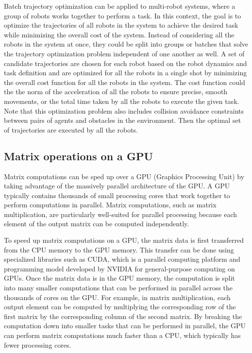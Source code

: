 Batch trajectory optimization can be applied to multi-robot systems, where a group of robots works together to perform a task. In this context, the goal is to optimize the trajectories of all robots in the system to achieve the desired task while minimizing the overall cost of the system. Instead of considering all the robots in the system at once, they could be split into groups or batches that solve the trajectory optimization problem independent of one another as well. A set of candidate trajectories are chosen for each robot based on the robot dynamics and task definition and are optimized for all the robots in a single shot by minimizing the overall cost function for all the robots in the system. The cost function could the the norm of the acceleration of all the robots to ensure precise, smooth movements, or the total time taken by all the robots to execute the given task. Note that this optimization problem also includes collision avoidance constraints between pairs of agents and obstacles in the environment. Then the optimal set of trajectories are executed by all the robots. 

\subsection{Matrix operations on a GPU}

Matrix computations can be sped up over a GPU (Graphics Processing Unit) by taking advantage of the massively parallel architecture of the GPU. A GPU typically contains thousands of small processing cores that work together to perform computations in parallel. Matrix computations, such as matrix multiplication, are particularly well-suited for parallel processing because each element of the output matrix can be computed independently.

To speed up matrix computations on a GPU, the matrix data is first transferred from the CPU memory to the GPU memory. This transfer can be done using specialized libraries such as CUDA, which is a parallel computing platform and programming model developed by NVIDIA for general-purpose computing on GPUs. Once the matrix data is in the GPU memory, the computation is split into many smaller computations that can be performed in parallel across the thousands of cores on the GPU. For example, in matrix multiplication, each output element can be computed by multiplying the corresponding row of the first matrix by the corresponding column of the second matrix. By breaking the computation down into smaller tasks that can be performed in parallel, the GPU can perform matrix computations much faster than a CPU, which typically has fewer processing cores.


